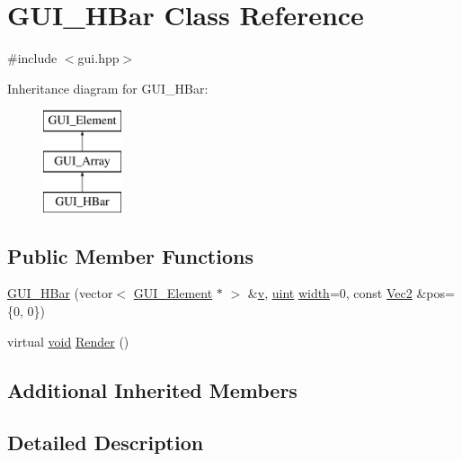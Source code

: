 \hypertarget{class_g_u_i___h_bar}{\section{G\-U\-I\-\_\-\-H\-Bar Class Reference}
\label{class_g_u_i___h_bar}
}


{\ttfamily \#include $<$gui.\-hpp$>$}

Inheritance diagram for G\-U\-I\-\_\-\-H\-Bar\-:\begin{figure}[H]
\begin{center}
\leavevmode
\includegraphics[height=3.000000cm]{class_g_u_i___h_bar}
\end{center}
\end{figure}
\subsection*{Public Member Functions}
\begin{DoxyCompactItemize}
\item 
\hyperlink{class_g_u_i___h_bar_adab95f5e1e3ff4596d2affe41efb4776}{G\-U\-I\-\_\-\-H\-Bar} (vector$<$ \hyperlink{class_g_u_i___element}{G\-U\-I\-\_\-\-Element} $\ast$ $>$ \&\hyperlink{_s_d_l__opengl_8h_a10a82eabcb59d2fcd74acee063775f90}{v}, \hyperlink{common_8hpp_a69aa29b598b851b0640aa225a9e5d61d}{uint} \hyperlink{_s_d_l__opengl_8h_a9a82cf3caff84cabc4598e2619faac17}{width}=0, const \hyperlink{class_vec2}{Vec2} \&pos=\{0, 0\})
\item 
virtual \hyperlink{_s_d_l__opengles2__gl2ext_8h_ae5d8fa23ad07c48bb609509eae494c95}{void} \hyperlink{class_g_u_i___h_bar_a9770330eb8c7a5292f2de46c0a9d2ee3}{Render} ()
\end{DoxyCompactItemize}
\subsection*{Additional Inherited Members}


\subsection{Detailed Description}


